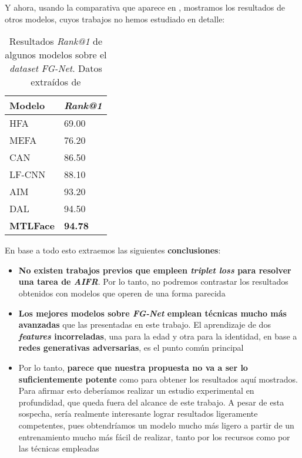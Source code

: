 Y ahora, usando la comparativa que aparece en \cite{informatica:best_fgnet_model}, mostramos los resultados de otros modelos, cuyos trabajos no hemos estudiado en detalle:

\begin{table}[H]
	\centering
	\begin{tabular}{|l|l|}
		\hline
		Modelo           & \textit{Rank@1} \\
		\hline
		HFA              & 69.00           \\
		MEFA             & 76.20           \\
		CAN              & 86.50           \\
		LF-CNN           & 88.10           \\
		AIM              & 93.20           \\
		DAL              & 94.50           \\
		\textbf{MTLFace} & \textbf{94.78}  \\
		\hline
	\end{tabular}
	\caption{Resultados \textit{Rank@1} de algunos modelos sobre el \textit{dataset} \textit{FG-Net}. Datos extraídos de \cite{informatica:best_fgnet_model}}
\end{table}

En base a todo esto extraemos las siguientes \textbf{conclusiones}:

\begin{itemize}
	\item \textbf{No existen trabajos previos que empleen \textit{triplet loss} para resolver una tarea de \textit{AIFR}}. Por lo tanto, no podremos contrastar los resultados obtenidos con modelos que operen de una forma parecida
	\item \textbf{Los mejores modelos sobre \textit{FG-Net} emplean técnicas mucho más avanzadas} que las presentadas en este trabajo. El aprendizaje de dos \textbf{\textit{features} incorreladas}, una para la edad y otra para la identidad, en base a \textbf{redes generativas adversarias}, es el punto común principal
	\item Por lo tanto, \textbf{parece que nuestra propuesta no va a ser lo suficientemente potente} como para obtener los resultados aquí mostrados. Para afirmar esto deberíamos realizar un estudio experimental en profundidad, que queda fuera del alcance de este trabajo. A pesar de esta sospecha, sería realmente interesante lograr resultados ligeramente competentes, pues obtendríamos un modelo mucho más ligero a partir de un entrenamiento mucho más fácil de realizar, tanto por los recursos como por las técnicas empleadas
\end{itemize}
